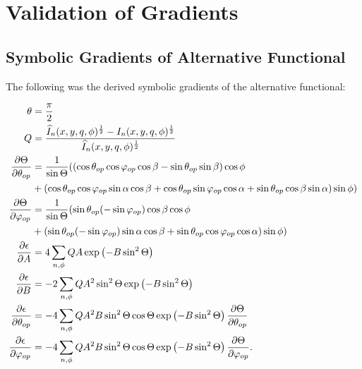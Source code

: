 \chapter{Validation of Gradients}


\section{Symbolic Gradients of Alternative Functional}

The following was the derived symbolic gradients of the alternative functional:

\begin{align}\label{eq:sym_grad_expsin}
    \begin{split}
        \theta &= \frac{\pi}{2} \\
        Q & = \frac{ \widehat{I}_{n}(x,y, q, \phi )^{\frac{1}{2}} - I_{n}(x,y, q, \phi )^{\frac{1}{2}}  }{ \widehat{I}_{n}(x,y, q, \phi )^{\frac{1}{2}} } \\
        \frac{\partial \Theta}{\partial \theta_{op}} & = \frac{1}{\sin{\Theta}} ( \left(\cos\theta_{op}\cos\varphi_{op}\cos\beta - \sin\theta_{op}\sin\beta\right)\cos\phi \\ &+ \left( \cos\theta_{op}\cos\varphi_{op}\sin\alpha\cos\beta + \cos\theta_{op}\sin\varphi_{op}\cos\alpha + \sin\theta_{op}\cos\beta\sin\alpha \right)\sin\phi ) \\
        \frac{\partial \Theta}{\partial \varphi_{op}} & = \frac{1}{\sin{\Theta}} ( \sin\theta_{op}(-\sin\varphi_{op})\cos\beta\cos\phi \\ &+ \left( \sin\theta_{op} (-\sin\varphi_{op})\sin\alpha\cos\beta + \sin\theta_{op}\cos\varphi_{op}\cos\alpha \right)\sin\phi ) \\
        \frac{\partial \epsilon}{\partial A} & = 4 \sum_{n, \phi} Q A \exp\left( - B \sin^2 \Theta\right) \\
        \frac{\partial \epsilon}{\partial B} & = -2 \sum_{n, \phi} Q A^{2} \sin^{2}\Theta \exp\left( - B \sin^2 \Theta\right) \\
        \frac{\partial \epsilon}{\partial \theta_{op}} & = - 4 \sum_{n, \phi} Q A^{2} B \sin^{2} \Theta \cos\Theta \exp\left( - B \sin^2 \Theta\right) \frac{\partial \Theta}{\partial \theta_{op}}   \\
        \frac{\partial \epsilon}{\partial \varphi_{op}} & = - 4 \sum_{n, \phi} Q A^{2} B \sin^{2} \Theta \cos\Theta \exp\left( - B \sin^2 \Theta\right) \frac{\partial \Theta}{\partial \varphi_{op}} .  \\
    \end{split}
\end{align}

